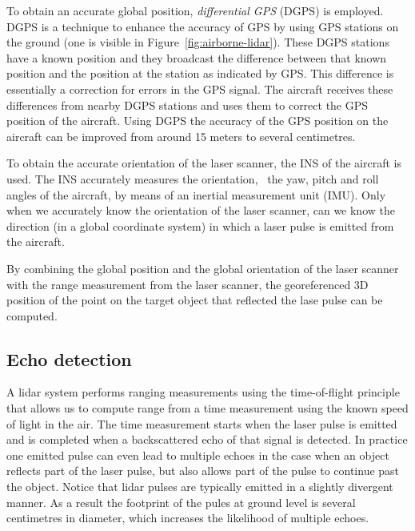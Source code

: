 To  obtain an accurate global position, \emph{differential GPS} (DGPS) is employed. 
DGPS is a technique to enhance the accuracy of GPS  by using GPS stations on the ground (one is visible in Figure~\ref{fig:airborne-lidar}). 
These DGPS stations have a known position and they broadcast the difference between that  known position and the position at the station as indicated by GPS\@. 
This difference is essentially a correction for errors in the GPS signal. The aircraft receives these differences from nearby DGPS stations and uses them to correct the GPS position of the aircraft. Using DGPS the accuracy of the GPS position on the aircraft can be improved from around 15 meters to several centimetres.

To obtain the accurate orientation of the laser scanner, the INS of the aircraft is used. 
The INS accurately measures the orientation, \ie\ the yaw, pitch  and roll angles of the aircraft, by means of an inertial measurement unit (IMU). 
Only when we accurately know the orientation of the laser scanner, can we know the direction (in a global coordinate system) in which a laser pulse is emitted from the aircraft.

By combining the global position and the global orientation of the laser scanner with the range measurement from the laser scanner, the georeferenced 3D position of  the point  on the target object that reflected the lase pulse can be computed.


\subsection{Echo detection}

A lidar system performs ranging measurements using the time-of-flight principle that allows us to compute range from a time measurement using the known speed of light in the air. 
The time measurement starts when the laser pulse is emitted and is completed when a backscattered echo of that signal is detected. 
In practice one emitted pulse can even lead to multiple echoes  in the case when an object reflects part of the laser pulse, but also allows part of the pulse to continue past the object. 
Notice that lidar pulses are typically emitted in a slightly divergent manner. As a result the footprint of the pules at ground level is several centimetres in diameter, which increases the likelihood of multiple echoes.

